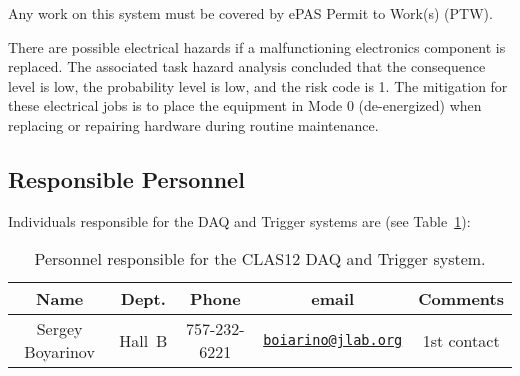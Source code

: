 Any work on this system must be covered by ePAS Permit to Work(s) (PTW).

There are possible electrical hazards if a malfunctioning electronics component is replaced. 
The associated task hazard analysis concluded that the consequence level is low, the 
probability level is low, and the risk code is 1. The mitigation for these electrical jobs is 
to place the equipment in Mode 0 (de-energized) when replacing or repairing hardware during 
routine maintenance.

\subsection{Responsible Personnel}

Individuals responsible for the DAQ and Trigger systems are (see Table~\ref{tb:daq}):

\begin{table}[!htb]
\centering
\begin{tabular}{|c|c|c|c|c|} \hline
Name&Dept.&Phone&email&Comments \\ \hline
Sergey Boyarinov&Hall~B&757-232-6221&\href{mailto:boiarino@jlab.org}{\nolinkurl{boiarino@jlab.org}}&1st contact \\ \hline
 \end{tabular}
\caption{Personnel responsible for the CLAS12 DAQ and Trigger system.} 
\label{tb:daq}
\end{table}

